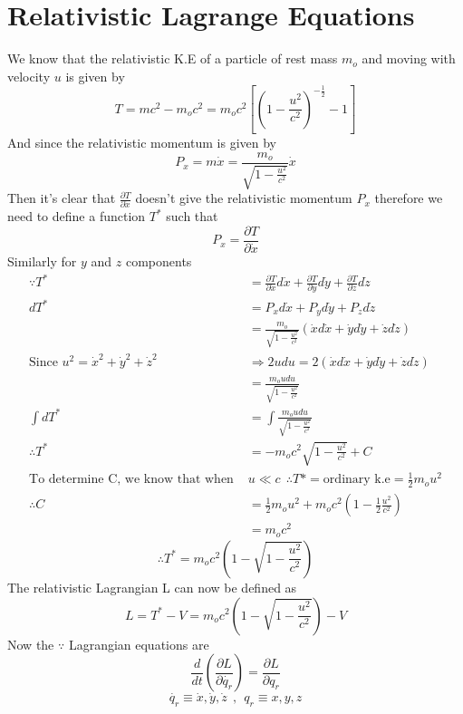 \section{Relativistic Lagrange Equations}
We know that the relativistic K.E of a particle of rest mass $m_o$ and moving with velocity $u$ is given by 
\[
    T = mc^2 - m_o c^2 = m_o c^2 \left[{\left(1- \frac{u^2}{c^2}\right)}^{-\frac{1}{2}}-1\right]    
\]
And since the relativistic momentum is given by 
\[
   P_x = m \dot{x} = \frac{m_o}{\sqrt{1 - \frac{u^2}{c^2}}} \dot{x}
\]
Then it's clear that $\frac{\partial T}{\partial \dot{x} }$ doesn't give the relativistic momentum $P_x$ therefore we need to define a function $T^*$ such that 
\[
    P_x = \frac{\partial T}{\partial \dot{x}}
\]
Similarly for $y$ and $z$ components
\begin{align*}
    \because T^* &= \frac{\partial T}{\partial \dot{x}} d\dot{x} + \frac{\partial T}{\partial \dot{y}} d\dot{y} + \frac{\partial T}{\partial \dot{z}} d\dot{z}\\
    dT^* &= P_x d\dot{x} + P_y d\dot{y} +P_z d\dot{z}\\
    &=\frac{m_o}{\sqrt{1 - \frac{u^2}{c^2}}} \left( \dot{x}d\dot{x} + \dot{y}d\dot{y} + \dot{z}d\dot{z}  \right)\\
 \text{Since } u^2 = \dot{x}^2 + \dot{y}^2 + \dot{z}^2 &\Longrightarrow 2u du =2 \left( \dot{x}d\dot{x} + \dot{y}d\dot{y} + \dot{z}d\dot{z}  \right) \\
    &=\frac{m_o u du}{\sqrt{1 - \frac{u^2}{c^2}}} \\
    \int dT^* &= \int \frac{m_o u du}{\sqrt{1 - \frac{u^2}{c^2}}} \\
\therefore T^* &= - m_o c^2\sqrt{1 - \frac{u^2}{c^2}} + C\\
\text{To determine C, we know that when }& u \ll c  \ \ \therefore T* = \text{ordinary k.e} = \frac{1}{2} m_o u^2\\
\therefore C &= \frac{1}{2} m_o u^2 + m_o c^2 \left(1- \frac{1}{2}\frac{u^2}{c^2}\right)\\
             &= m_o c^2
\end{align*}
\[
\therefore T^* = m_o c^2\left(1- \sqrt{1 - \frac{u^2}{c^2}}\right)
\]
The relativistic Lagrangian L can now be defined as 
\[
L = T^* - V = m_o c^2\left(1- \sqrt{1 - \frac{u^2}{c^2}}\right) - V
\]
Now the $\because$ Lagrangian equations are
\[
\frac{d}{dt}\left( \frac{\partial L}{\partial \dot{q_r}} \right) = \frac{\partial L}{\partial q_r}
\]
\[
    \dot{q_r} \equiv  \dot{x} , \dot{y}  , \dot{z}
    \ \ , \ \ 
    q_r \equiv x , y , z
\]
